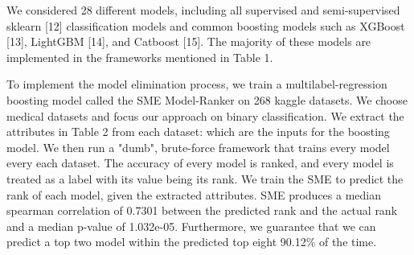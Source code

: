 \documentclass{article}
\begin{document}
We considered 28 different models, including all supervised and semi-supervised sklearn [12] classification models and common boosting models such as XGBoost [13], LightGBM [14], and Catboost [15]. The majority of these models are implemented in the frameworks mentioned in Table 1. 

To implement the model elimination process, we train a multilabel-regression boosting model called the SME Model-Ranker on 268 kaggle datasets. We choose medical datasets and focus our approach on binary classification. We extract the attributes in Table 2 from each dataset: which are the inputs for the boosting model. We then run a "dumb", brute-force framework that trains every model every each dataset. The accuracy of every model is ranked, and every model is treated as a label with its value being its rank. We train the SME to predict the rank of each model, given the extracted attributes. SME produces a median spearman correlation of 0.7301 between the predicted rank and the actual rank and a median p-value of 1.032e-05. Furthermore, we guarantee that we can predict a top two model within the predicted top eight 90.12\% of the time.
\end{document}
